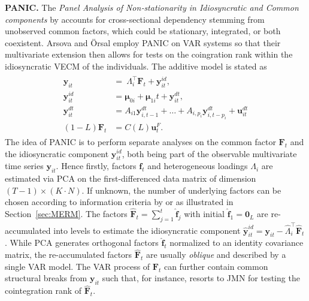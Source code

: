 \textbf{PANIC.} The \textit{Panel Analysis of Non‐stationarity in Idiosyncratic and Common components} by \cite{BaiNg2004} accounts for cross-sectional dependency stemming from unobserved common factors, which could be stationary, integrated, or both coexistent. Arsova and Örsal \citeyearpar{ArsovaOersal2017,ArsovaOersal2018} employ PANIC on VAR systems so that their multivariate extension then allows for tests on the coingration rank within the idiosyncratic VECM of the individuals. The additive model is stated as
\begin{align} \label{eq:PANIC}
\begin{split}
	\boldsymbol{y}_{it} \ & = \ \Lambda_i^\top \boldsymbol{F}_t + \boldsymbol{y}^{i \! d}_{it}, \\
	\boldsymbol{y}^{i \! d}_{it} \ & = \boldsymbol{\mu}_{0i} + \boldsymbol{\mu}_{1i}t + \boldsymbol{y}^{d \! t}_{it}, \\
	\boldsymbol{y}^{d \! t}_{it} \ & = A_{i1} \boldsymbol{y}^{d \! t}_{i,t-1} + \ldots + A_{i,p_i} \boldsymbol{y}^{d \! t}_{i,t-p_i} + \boldsymbol{u}^{d \! t}_{it} \\
	(1-L) \boldsymbol{F}_t & = C(L) \boldsymbol{u}^{F}_t.
\end{split}
\end{align}
The idea of PANIC is to perform separate analyses on the common factor $ \boldsymbol{F}_t $ and the idiosyncratic component $ \boldsymbol{y}^{i \! d}_{it} $, both being part of the observable multivariate time series $ \boldsymbol{y}_{it} $. Hence firstly, factors $ \boldsymbol{f}_t $ and heterogeneous loadings $ \Lambda_i $ are estimated via PCA on the first-differenced data matrix of dimension $ (T-1) \times (K \cdot N) $. If unknown, the number of underlying factors can be chosen according to information criteria by \citet{BaiNg2002} or \cite{Onatski2010} as illustrated in Section~\ref{sec:MERM}. The factors $ \boldsymbol{\hat{F}}_t = \sum_{j=1}^{t} \boldsymbol{\hat{f}}_j $ with initial $ \boldsymbol{\hat{f}}_1 = \boldsymbol{0}_L $ are re-accumulated into levels to estimate the idiosyncratic component $ \boldsymbol{\hat{y}}^{i \! d}_{it} = \boldsymbol{y}_{it} - \hat{\Lambda}_i^\top \boldsymbol{\hat{F}}_t $. While PCA generates orthogonal factors $ \boldsymbol{\hat{f}}_t $ normalized to an identity covariance matrix, the re-accumulated factors $ \boldsymbol{\hat{F}}_t $ are usually \textit{oblique} and described by a single VAR model. The VAR process of $ \boldsymbol{{F}}_t $ can further contain common structural breaks from $ \boldsymbol{y}_{it} $ such that, for instance, \citet{Oersal2017} resorts to JMN \citeyearpar{JohansenEtAl2000} for testing the cointegration rank of $ \boldsymbol{\hat{F}}_t $.

